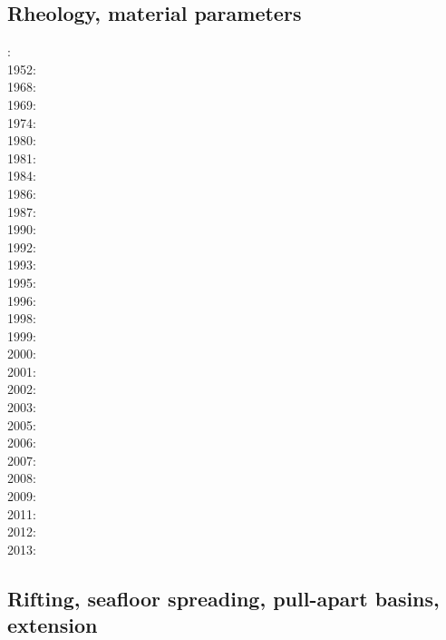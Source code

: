 \subsection*{Rheology, material parameters}

: \cite{druc51}\cite{hafn51}\\
1952: \cite{drpr52}\\
1968: \cite{byer68}\\
1969: \cite{hand69}\\
1974: \cite{kogo74}\\
1980: \cite{brko80}\\
1981: \cite{delo81}\\
1984: \cite{rafi84}\cite{chpa84}\\
1986: \cite{kapf86}\\
1987: \cite{kikr87}\\
1990: \cite{wica90}\\
1992: \cite{bako92}\cite{chbo92}\cite{kali92}\cite{kohl92}\\
1993: \cite{kawu93}\\
1995: \cite{koem95}\\
1996: \cite{wasd96}\\
1998: \cite{copo98}\\
1999: \cite{kayk99}\\
2000: \cite{rydr00}\cite{rana00}\\
2001: \cite{lova01}\\
2002: \cite{hirt02}\\
2003: \cite{hiko03}\cite{kaju03}\cite{mohi03}\\
2005: \cite{didr05}\cite{drur05}\\
2006: \cite{rygw06}\cite{buwa06}\\
2007: \cite{hirw07}\cite{kohl07}\\
2008: \cite{lemm08}\cite{budr08}\cite{koka08}\\
2009: \cite{kayk09}\cite{kako09}\\
2011: \cite{lell11}\cite{kemk11}\\
2012: \cite{reyn12}\\
2013: \cite{lepo13}\cite{miam13}


\subsection*{Rifting, seafloor spreading, pull-apart basins, extension}

